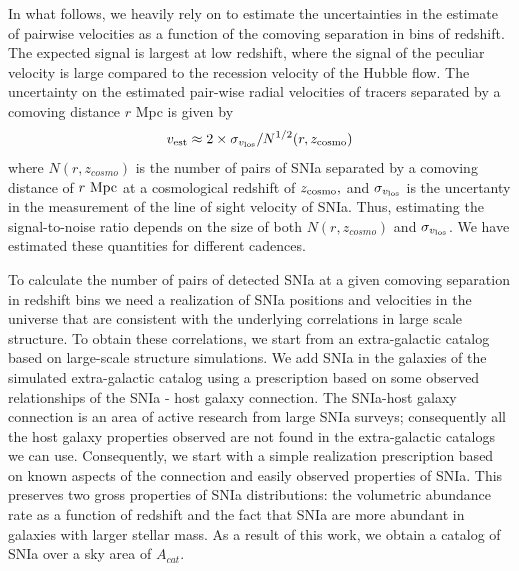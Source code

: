 \documentclass[a4paper,10pt]{article}
\begin{document}
In what follows, we heavily rely on \cite{2011PhRvD..83d3004B} to estimate the uncertainties in the estimate of pairwise velocities as a function of the comoving separation in bins of redshift. The expected signal is largest at low redshift, where the signal of the peculiar velocity is large compared to the recession velocity of the Hubble flow.  The uncertainty on the estimated pair-wise radial velocities of tracers separated by a comoving distance $r$ Mpc is given by
\begin{equation}
v_{\rm{est}} \approx 2 \times \sigma_{v_{\rm{los}}} / N^{1/2}(r, z_{\rm{cosmo}})
\end{equation}
where $N(r,z_{cosmo})$ is the number of pairs of SNIa separated by a comoving distance of $r~\rm{Mpc}$
at a cosmological redshift of $z_{\rm{cosmo}},$ and $\sigma_{v_{\rm{los}}}$ is the uncertanty in the
measurement of the line of sight velocity of SNIa. Thus, estimating the signal-to-noise ratio depends on the size of both $N(r, z_{cosmo})$ and $\sigma_{v_{\rm{los}}}$. We have estimated these quantities for different cadences. 

To calculate the number of pairs of detected SNIa at a given comoving separation in redshift bins we need a realization of SNIa positions and velocities in the universe that are consistent with the underlying correlations in large scale structure. To obtain these correlations, we start from an extra-galactic catalog based on large-scale structure simulations. We add SNIa in the galaxies of the simulated extra-galactic catalog using a prescription based on some observed relationships of the SNIa - host galaxy connection. The SNIa-host galaxy connection is an area of active research from large SNIa surveys; consequently all the host galaxy properties observed are not found in the extra-galactic catalogs we can use. Consequently, we start with a simple realization prescription based on known aspects of the connection and easily observed properties of SNIa. This preserves two gross properties of SNIa distributions: the volumetric abundance rate as a function of redshift and the fact that SNIa are more abundant in galaxies with larger stellar mass. As a result of this work, we obtain a catalog of SNIa over a sky area of $A_{cat}.$
\end{document}
